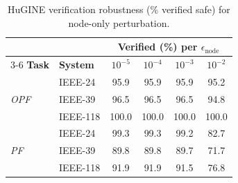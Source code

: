 \begin{table}[t]
\centering
\caption{HuGINE verification robustness (\% verified safe) for node-only perturbation.}
\label{tab:hugine_robustness}
\setlength{\tabcolsep}{10pt}
\begin{tabular}{l l c c c c}
\toprule
& & \multicolumn{4}{c}{Verified (\%) per $\epsilon_{\mathrm{node}}$} \\
\cmidrule(lr){3-6}
\textbf{Task} & \textbf{System} & $10^{-5}$ & $10^{-4}$ & $10^{-3}$ & $10^{-2}$ \\
\midrule
\multirow{3}{*}{\textit{OPF}} & IEEE-24 & 95.9 & 95.9 & 95.9 & 95.2 \\
 & IEEE-39 & 96.5 & 96.5 & 96.5 & 94.8 \\
 & IEEE-118 & 100.0 & 100.0 & 100.0 & 100.0 \\
\midrule
\multirow{3}{*}{\textit{PF}} & IEEE-24 & 99.3 & 99.3 & 99.2 & 82.7 \\
 & IEEE-39 & 89.8 & 89.8 & 89.7 & 71.7 \\
 & IEEE-118 & 91.9 & 91.9 & 91.5 & 76.8 \\
\bottomrule
\end{tabular}
\end{table}
